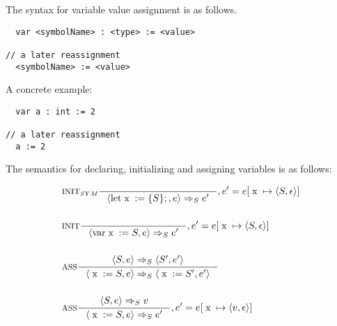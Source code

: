 The syntax for variable value assignment is as follows.

\begin{verbatim}
  var <symbolName> : <type> := <value>

// a later reassignment
  <symbolName> := <value>
\end{verbatim}
A concrete example:

\begin{verbatim}
  var a : int := 2
  
// a later reassignment
  a := 2
\end{verbatim}

The semantics for declaring, initializing and assigning variables is as follows:

\begin{align*}
&\inference[$\text{INIT}_{SYM}$]{}
                         {\Braket{\Tlet \Tx := \{S\};,e} \Rightarrow_S e'}
												 {, e' = e[\Tx \mapsto \Braket{S,\epsilon}]}
\\\\
&\inference[$\text{INIT}$]{}
                         {\Braket{\Tvar \Tx := S,e} \Rightarrow_S e'}
												 {, e' = e[\Tx \mapsto \Braket{S,\epsilon}]}
\\\\
&\inference[ASS]{\Braket{S,e} \Rightarrow_S \Braket{S',e'}}
                 {\Braket{\Tx := S,e} \Rightarrow_S \Braket{\Tx := S',e'}}
\\\\
&\inference[ASS]{\Braket{S,e} \Rightarrow_S v}
                 {\Braket{\Tx := S,e} \Rightarrow_S e'}
								 {, e' = e[\Tx \mapsto \Braket{v,\epsilon}]}
\end{align*}